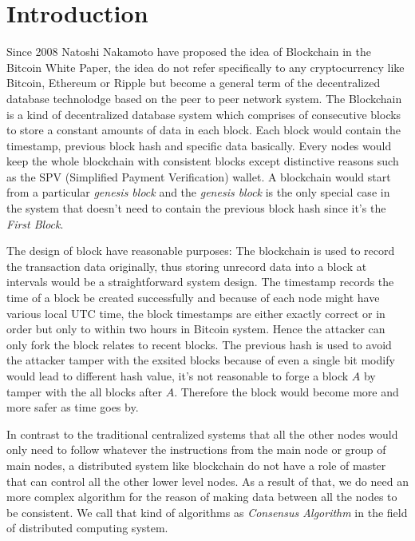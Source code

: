 \chapter{Introduction}
\label{c:intro}

Since 2008 Natoshi Nakamoto have proposed the idea of Blockchain in the Bitcoin White Paper\cite{Bitcoin}, the idea do not refer specifically to any cryptocurrency like Bitcoin, Ethereum\cite{Ethereum} or Ripple\cite{Ripple} but become a general term of the decentralized database technolodge based on the peer to peer network system.
The Blockchain is a kind of decentralized database system which comprises of consecutive blocks to store a constant amounts of data in each block. 
Each block would contain the timestamp, previous block hash and specific data basically. Every nodes would keep the whole blockchain with consistent blocks except distinctive reasons such as the SPV (Simplified Payment Verification) wallet.
A blockchain would start from a particular {\em genesis block} and the {\em genesis block} is the only special case in the system that doesn't need to contain the previous block hash since it's the {\em First Block}. \par
	The design of block have reasonable purposes: The blockchain is used to record the transaction data originally, thus storing unrecord data into a block at intervals would be a straightforward system design. 
The timestamp records the time of a block be created successfully and because of each node might have various local UTC time, the block timestamps are either exactly correct or in order but only to within two hours in Bitcoin system.
Hence the attacker can only fork the block relates to recent blocks. The previous hash is used to avoid the attacker tamper with the exsited blocks because of even a single bit modify would lead to different hash value, it's not reasonable to forge a block $A$ by tamper with the all blocks after $A$. Therefore the block would become more and more safer as time goes by.\par
	In contrast to the traditional centralized systems that all the other nodes would only need to follow whatever the instructions from the main node or group of main nodes, a distributed system like blockchain do not have a role of master that can control all the other lower level nodes.
As a result of that, we do need an more complex algorithm for the reason of making data between all the nodes to be consistent.
We call that kind of algorithms as {\em Consensus Algorithm} in the field of distributed computing system.
